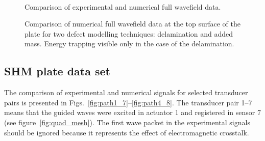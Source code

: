 \begin{figure} [h!]
	\centering
   \hspace{0.5 cm} 	
   \\	
   \hspace{0.5 cm} 	
\caption{Comparison of experimental and numerical full wavefield data.}
	\label{fig:wavefields_comparison}
\end{figure}

\begin{figure} [h!]
		\centering
		\hspace{0.5 cm} 	
\caption{Comparison of numerical full wavefield data at the top surface of the plate for two defect modelling techniques: delamination and added mass. Energy trapping visible only in the case of the delamination.}
	\label{fig:wave_entrapment}
\end{figure}
\clearpage

\subsection{SHM plate data set}

The comparison of experimental and numerical signals for selected transducer pairs is presented in Figs.~\ref{fig:path1_7}--\ref{fig:path4_8}. The transducer pair 1--7 means that the guided waves were excited in actuator 1 and registered in sensor 7 (see figure~\ref{fig:quad_mesh}). The first wave packet in the experimental signals should be ignored because it represents the effect of electromagnetic crosstalk.

